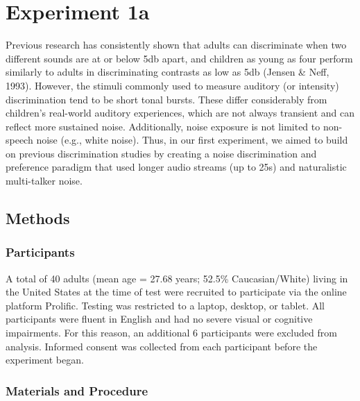 \documentclass[10pt, letterpaper]{article}
\begin{document}
\hypertarget{experiment-1a}{%
\section{Experiment 1a}\label{experiment-1a}}

Previous research has consistently shown that adults can discriminate
when two different sounds are at or below 5db apart, and children as
young as four perform similarly to adults in discriminating contrasts as
low as 5db (Jensen \& Neff, 1993). However, the stimuli commonly used to
measure auditory (or intensity) discrimination tend to be short tonal
bursts. These differ considerably from children's real-world auditory
experiences, which are not always transient and can reflect more
sustained noise. Additionally, noise exposure is not limited to
non-speech noise (e.g., white noise). Thus, in our first experiment, we
aimed to build on previous discrimination studies by creating a noise
discrimination and preference paradigm that used longer audio streams
(up to 25s) and naturalistic multi-talker noise.

\hypertarget{methods}{%
\subsection{Methods}\label{methods}}

\hypertarget{participants}{%
\subsubsection{Participants}\label{participants}}

A total of 40 adults (mean age = 27.68 years; 52.5\% Caucasian/White)
living in the United States at the time of test were recruited to
participate via the online platform Prolific. Testing was restricted to
a laptop, desktop, or tablet. All participants were fluent in English
and had no severe visual or cognitive impairments. For this reason, an
additional 6 participants were excluded from analysis. Informed consent
was collected from each participant before the experiment began.

\hypertarget{materials-and-procedure}{%
\subsubsection{Materials and Procedure}\label{materials-and-procedure}}
\end{document}
